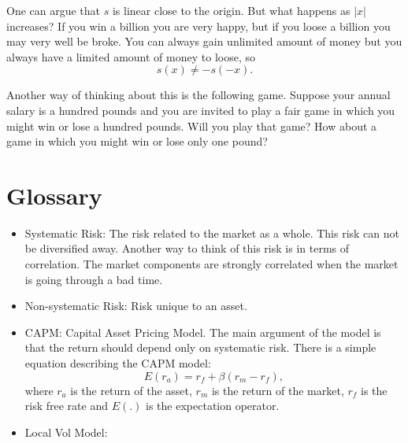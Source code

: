 \documentclass{amsart}
\theoremstyle{plain}
\numberwithin{equation}{section}
\begin{document}
One can argue that $s$ is linear close to the 
origin. But what happens as $|x|$ increases?
If you win a billion you are very happy, but if you 
loose a billion you may very well be broke. You can 
always gain unlimited amount of money but you always 
have a limited amount of money to loose, so 
\begin{equation}
s(x) \neq -s(-x).
\end{equation}

Another way of thinking about this is the following 
game. Suppose your annual salary is a hundred pounds
and you are invited to play a fair game in which you 
might win or lose a hundred pounds. Will you play that 
game? How about a game in which you might win or lose 
only one pound?

\section{Glossary}
\begin{itemize}
	\item Systematic Risk: The risk related to the market as a whole. This 
	risk can not be diversified away. Another way to think of this risk 
	is in terms of correlation. The market components are strongly correlated
	when the market is going through a bad time.
	\item Non-systematic Risk: Risk unique to an asset.
	\item CAPM: Capital Asset Pricing Model. The main argument of the model is that 
	the return should depend only on systematic risk. There is a simple 
	equation describing the CAPM model:
	\begin{equation}
	E(r_a) = r_f + \beta( r_m - r_f ),
	\label{eq:capm}
	\end{equation}
	where $r_a$ is the return of the asset,
	$r_m$ is the return of the market, 
	$r_f$ is the risk free rate and $E(.)$ is 
	the expectation operator. 
	
	\item Local Vol Model: 
	
	
\end{itemize}

%


\end{document}
